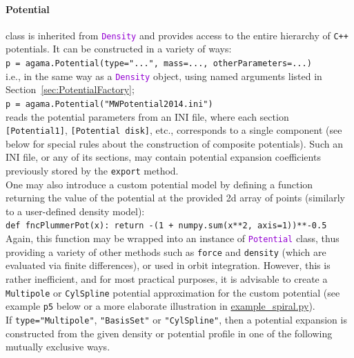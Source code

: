 \documentclass[12pt]{article}
\newcommand{\Cpp}  {\texttt{C++}\xspace}
\newcommand{\ttt}[1]{\textcolor{darkviolet}{\texttt{#1}}}
\newcommand{\ppp}[1]{\textcolor{darkolive} {\texttt{#1}}}
\let\oldparagraph\paragraph
\renewcommand{\paragraph}[1]{\vspace{-2mm}\oldparagraph{#1}}
\begin{document}
\paragraph{Potential} \label{sec:PythonPotential} class is inherited from \ttt{Density} and provides access to the entire hierarchy of \Cpp potentials. It can be constructed in a variety of ways: \\
\texttt{p = agama.Potential(type="...", mass=..., otherParameters=...)}\\
i.e., in the same way as a \ttt{Density} object, using named arguments listed in Section~\ref{sec:PotentialFactory};\\
\texttt{p = agama.Potential("MWPotential2014.ini")}\\
reads the potential parameters from an INI file, where each section \ppp{[Potential1]}, \ppp{[Potential disk]}, etc., corresponds to a single component (see below for special rules about the construction of composite potentials). Such an INI file, or any of its sections, may contain potential expansion coefficients previously stored by the \texttt{export} method. \\[2mm]
One may also introduce a custom potential model by defining a function returning the value of the potential at the provided 2d array of points (similarly to a user-defined density model):\\
\texttt{def fncPlummerPot(x): return -(1 + numpy.sum(x**2, axis=1))**-0.5}\\[1mm]
Again, this function may be wrapped into an instance of \ttt{Potential} class, thus providing a variety of other methods such as \texttt{force} and \texttt{density} (which are evaluated via finite differences), or used in orbit integration. However, this is rather inefficient, and for most practical purposes, it is advisable to create a \ppp{Multipole} or \ppp{CylSpline} potential approximation for the custom potential (see example \texttt{p5} below or a more elaborate illustration in \hyperref[sec:ExampleSpiral]{example_spiral.py}).\\[2mm]
If \ppp{type="Multipole"}, \ppp{"BasisSet"} or \ppp{"CylSpline"}, then a potential expansion is constructed from the given density or potential profile in one of the following mutually exclusive ways.
\end{document}
